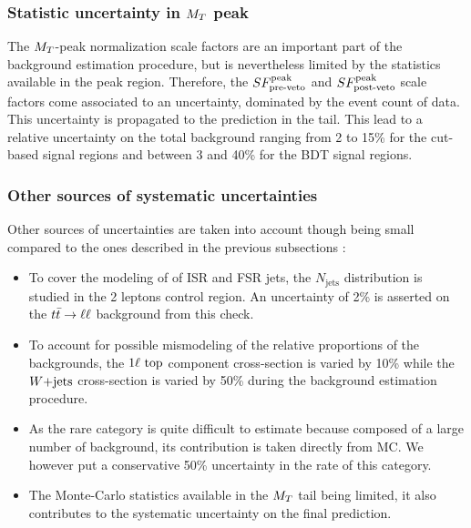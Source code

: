             \subsubsection{Statistic uncertainty in $M_T$ peak}
            
            The $M_T$-peak normalization scale factors are an important part of the background
            estimation procedure, but is nevertheless limited by the statistics available
            in the peak region. Therefore, the $SF_{\text{pre-veto}}^{\text{peak}}$ and $SF_{\text{post-veto}}^{\text{peak}}$ scale factors come
            associated to an uncertainty, dominated by the event count of data. This
            uncertainty is propagated to the prediction in the tail. This lead to a 
            relative uncertainty on the total background ranging from 2 to 15\% for the cut-based
            signal regions and between 3 and 40\% for the BDT signal regions.

            \subsubsection{Other sources of systematic uncertainties}

            Other sources of uncertainties are taken into account though being small compared
            to the ones described in the previous subsections :
            \begin{itemize}
                \item To cover the modeling of of ISR and FSR jets, the $N_\text{jets}$
                      distribution is studied in the 2 leptons control region. An
                      uncertainty of 2\% is asserted on the $t\bar{t} \rightarrow \ell \ell$ background
                      from this check.
                \item To account for possible mismodeling of the relative proportions of
                      the backgrounds, the $1\ell~\text{top}$ component cross-section
                      is varied by 10\% while the $\text{$W$+jets}$ cross-section is varied by 50\%
                      during the background estimation procedure.
                \item As the rare category is quite difficult to estimate because composed
                      of a large number of background, its contribution is taken directly
                      from MC. We however put a conservative 50\% uncertainty in the
                      rate of this category.
                \item The Monte-Carlo statistics available in the $M_T$ tail being limited,
                      it also contributes to the systematic uncertainty on the final prediction.
            \end{itemize}
    
